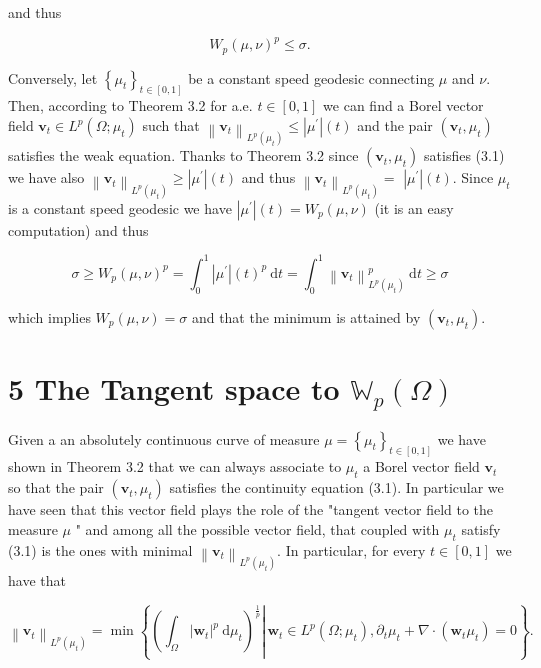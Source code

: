 \documentclass[10pt]{article}
\begin{document}
and thus

\[
W_{p}(\mu, \nu)^{p} \leq \sigma .
\]

Conversely, let \(\left\{\mu_{t}\right\}_{t \in[0,1]}\) be a constant speed geodesic connecting \(\mu\) and \(\nu\). Then, according to Theorem 3.2 for a.e. \(t \in[0,1]\) we can find a Borel vector field \(\mathbf{v}_{t} \in L^{p}\left(\Omega ; \mu_{t}\right)\) such that \(\left\|\mathbf{v}_{t}\right\|_{L^{p}\left(\mu_{t}\right)} \leq\left|\mu^{\prime}\right|(t)\) and the pair \(\left(\mathbf{v}_{t}, \mu_{t}\right)\) satisfies the weak equation. Thanks to Theorem 3.2 since \(\left(\mathbf{v}_{t}, \mu_{t}\right)\) satisfies (3.1) we have also \(\left\|\mathbf{v}_{t}\right\|_{L^{p}\left(\mu_{t}\right)} \geq\left|\mu^{\prime}\right|(t)\) and thus \(\left\|\mathbf{v}_{t}\right\|_{L^{p}\left(\mu_{t}\right)}=\) \(\left|\mu^{\prime}\right|(t)\). Since \(\mu_{t}\) is a constant speed geodesic we have \(\left|\mu^{\prime}\right|(t)=W_{p}(\mu, \nu)\) (it is an easy computation) and thus

\[
\sigma \geq W_{p}(\mu, \nu)^{p}=\int_{0}^{1}\left|\mu^{\prime}\right|(t)^{p} \mathrm{~d} t=\int_{0}^{1}\left\|\mathbf{v}_{t}\right\|_{L^{p}\left(\mu_{t}\right)}^{p} \mathrm{~d} t \geq \sigma
\]

which implies \(W_{p}(\mu, \nu)=\sigma\) and that the minimum is attained by \(\left(\mathbf{v}_{t}, \mu_{t}\right)\).

\section*{5 The Tangent space to \(\mathbb{W}_{p}(\Omega)\)}
Given a an absolutely continuous curve of measure \(\mu=\left\{\mu_{t}\right\}_{t \in[0,1]}\) we have shown in Theorem 3.2 that we can always associate to \(\mu_{t}\) a Borel vector field \(\mathbf{v}_{t}\) so that the pair \(\left(\mathbf{v}_{t}, \mu_{t}\right)\) satisfies the continuity equation (3.1). In particular we have seen that this vector field plays the role of the "tangent vector field to the measure \(\mu\) " and among all the possible vector field, that coupled with \(\mu_{t}\) satisfy (3.1) is the ones with minimal \(\left\|\mathbf{v}_{t}\right\|_{L^{p}\left(\mu_{t}\right)}\). In particular, for every \(t \in[0,1]\) we have that

\[
\left\|\mathbf{v}_{t}\right\|_{L^{p}\left(\mu_{t}\right)}=\min \left\{\left.\left(\int_{\Omega}\left|\mathbf{w}_{t}\right|^{p} \mathrm{~d} \mu_{t}\right)^{\frac{1}{p}} \right\rvert\, \mathbf{w}_{t} \in L^{p}\left(\Omega ; \mu_{t}\right), \partial_{t} \mu_{t}+\nabla \cdot\left(\mathbf{w}_{t} \mu_{t}\right)=0\right\} .
\]
\end{document}
